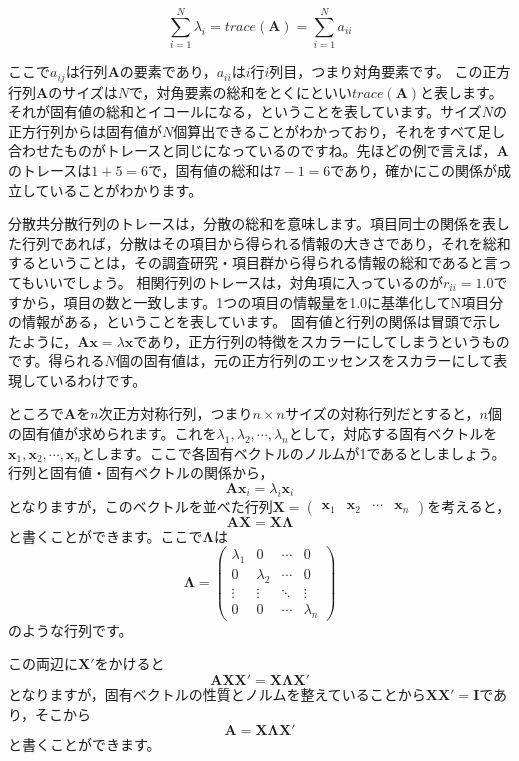 \documentclass{ltjsbook}
\begin{document}
\[ \sum_{i=1}^N \lambda_i = trace(\bm{A}) = \sum_{i=1}^N a_{ii} \]

ここで$a_{ij}$は行列$\bm{A}$の要素であり，$a_{ii}$は$i$行$i$列目，つまり対角要素です。
この正方行列$\bm{A}$のサイズは$N$で，対角要素の総和をとくにといい$trace(\bm{A})$と表します。
それが固有値の総和とイコールになる，ということを表しています。サイズ$N$の正方行列からは固有値が$N$個算出できることがわかっており，それをすべて足し合わせたものがトレースと同じになっているのですね。先ほどの例で言えば，$\bm{A}$のトレースは$1+5=6$で，固有値の総和は$7-1=6$であり，確かにこの関係が成立していることがわかります。

分散共分散行列のトレースは，分散の総和を意味します。項目同士の関係を表した行列であれば，分散はその項目から得られる情報の大きさであり，それを総和するということは，その調査研究・項目群から得られる情報の総和であると言ってもいいでしょう。
相関行列のトレースは，対角項に入っているのが$r_{ii}=1.0$ですから，項目の数と一致します。1つの項目の情報量を1.0に基準化してN項目分の情報がある，ということを表しています。
固有値と行列の関係は冒頭で示したように，$\bm{Ax}=\lambda \bm{x}$であり，正方行列の特徴をスカラーにしてしまうというものです。得られる$N$個の固有値は，元の正方行列のエッセンスをスカラーにして表現しているわけです。


ところで$\bm{A}$を$n$次正方対称行列，つまり$n \times n$サイズの対称行列だとすると，$n$個の固有値が求められます。これを$\lambda_1,\lambda_2,\cdots,\lambda_n$として，対応する固有ベクトルを$\bm{x}_1,\bm{x}_2,\cdots,\bm{x}_n$とします。ここで各固有ベクトルのノルムが1であるとしましょう。行列と固有値・固有ベクトルの関係から，
\[ \bm{Ax}_i = \lambda_i\bm{x}_i\]
となりますが，このベクトルを並べた行列$\bm{X}=\begin{pmatrix}\bm{x}_1&\bm{x}_2& \cdots & \bm{x}_n\end{pmatrix}$を考えると，
\[ \bm{AX} = \bm{X \Lambda} \]
と書くことができます。ここで$\bm{\Lambda}$は
\[ \bm{\Lambda} =
	\begin{pmatrix} \lambda_1 & 0         & \cdots & 0         \\
                0         & \lambda_2 & \cdots & 0         \\
                \vdots    & \vdots    & \ddots & \vdots    \\
                0         & 0         & \cdots & \lambda_n\end{pmatrix}
\]
のような行列です。

この両辺に$\bm{X}'$をかけると
\[ \bm{AXX}' = \bm{X \Lambda X}' \]
となりますが，固有ベクトルの性質とノルムを整えていることから$\bm{XX}'=\bm{I}$であり，そこから
\[ \bm{A} = \bm{X \Lambda X}' \]
と書くことができます。
\end{document}
